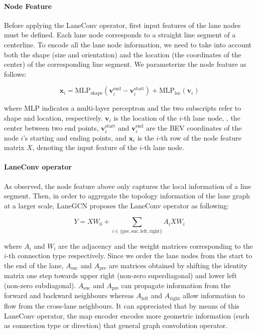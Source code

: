 \paragraph{Node Feature}
\label{par:7_improving_efficiency_node_feature}

Before applying the LaneConv operator, first input features of the lane nodes must be defined. Each lane node corresponds to a straight line segment of a centerline. To encode all the lane node information, we need to take into account both the shape (size and orientation) and the location (the coordinates of the center) of the corresponding line segment. We parameterize the node feature as follows:

\begin{equation}
	\mathbf{x}_i = \text{MLP}_\text{shape} \left( \mathbf{v}_i^{\text{end}} - \mathbf{v}_i^{\text{start}} \right)
	+ \text{MLP}_{\text{loc}}\left(\textbf{v}_i\right)
	\label{eqn:node_feat}
\end{equation}

where $\text{MLP}$ indicates a multi-layer perceptron and the two subscripts refer to shape and location, respectively.  $\textbf{v}_i$ is the location of the $i$-th lane node, \ie, the center between two end points, $\mathbf{v}_i^{\text{start}}$ and $\mathbf{v}_i^{\text{end}}$ are the \ac{BEV} coordinates of the node $i$'s starting and ending points, and $\mathbf{x}_i$ is the $i$-th row of the node feature matrix $X$, denoting the input feature of the $i$-th lane node.

\paragraph{LaneConv operator}
\label{par:7_improving_efficiency_lane_conv}

As observed, the node feature above only captures the local information of a line segment. Then, in order to aggregate the topology information of the lane graph at a larger scale, LaneGCN \cite{liang2020learning} proposes the LaneConv operator as following:

\begin{equation}
	Y = X W_0 + \sum_{i \in \{ \text{pre}, \text{suc}, \text{left}, \text{right} \}} {A_{i} X W_{i}}
	\label{eqn:laneconv}
\end{equation}

where $A_{i}$ and $W_i$ are the adjacency and the weight matrices corresponding to the $i$-th connection type respectively. Since we order the lane nodes from the start to the end of the lane, $A_{\text{suc}}$ and $A_{\text{pre}}$ are matrices obtained by shifting the identity matrix one step towards upper right (non-zero superdiagonal) and lower left (non-zero subdiagonal). $A_{\text{suc}}$ and $A_{\text{pre}}$ can propagate information from the forward and backward neighbours whereas $A_{\text{left}}$ and $A_{\text{right}}$ allow information to flow from the cross-lane neighbours. It can appreciated that by means of this LaneConv operator, the map encoder encodes more geometric information (such as connection type or direction) that general graph convolution operator.

